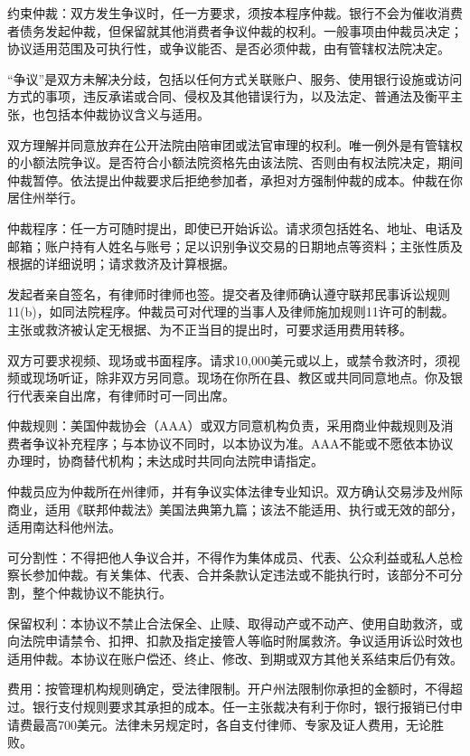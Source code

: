 \documentclass[UTF8,fontset=none,11pt,a4paper]{ctexart}
\begin{document}
约束仲裁：双方发生争议时，任一方要求，须按本程序仲裁。银行不会为催收消费者债务发起仲裁，但保留就其他消费者争议仲裁的权利。一般事项由仲裁员决定；协议适用范围及可执行性，或争议能否、是否必须仲裁，由有管辖权法院决定。


“争议”是双方未解决分歧，包括以任何方式关联账户、服务、使用银行设施或访问方式的事项，违反承诺或合同、侵权及其他错误行为，以及法定、普通法及衡平主张，也包括本仲裁协议含义与适用。


双方理解并同意放弃在公开法院由陪审团或法官审理的权利。唯一例外是有管辖权的小额法院争议。是否符合小额法院资格先由该法院、否则由有权法院决定，期间仲裁暂停。依法提出仲裁要求后拒绝参加者，承担对方强制仲裁的成本。仲裁在你居住州举行。


仲裁程序：任一方可随时提出，即使已开始诉讼。请求须包括姓名、地址、电话及邮箱；账户持有人姓名与账号；足以识别争议交易的日期地点等资料；主张性质及根据的详细说明；请求救济及计算根据。


发起者亲自签名，有律师时律师也签。提交者及律师确认遵守联邦民事诉讼规则11(b)，如同法院程序。仲裁员可对代理的当事人及律师施加规则11许可的制裁。主张或救济被认定无根据、为不正当目的提出时，可要求适用费用转移。


双方可要求视频、现场或书面程序。请求10,000美元或以上，或禁令救济时，须视频或现场听证，除非双方另同意。现场在你所在县、教区或共同同意地点。你及银行代表亲自出席，有律师时可一同出席。


仲裁规则：美国仲裁协会（AAA）或双方同意机构负责，采用商业仲裁规则及消费者争议补充程序；与本协议不同时，以本协议为准。AAA不能或不愿依本协议办理时，协商替代机构；未达成时共同向法院申请指定。


仲裁员应为仲裁所在州律师，并有争议实体法律专业知识。双方确认交易涉及州际商业，适用《联邦仲裁法》美国法典第九篇；该法不能适用、执行或无效的部分，适用南达科他州法。


可分割性：不得把他人争议合并，不得作为集体成员、代表、公众利益或私人总检察长参加仲裁。有关集体、代表、合并条款认定违法或不能执行时，该部分不可分割，整个仲裁协议不能执行。


保留权利：本协议不禁止合法保全、止赎、取得动产或不动产、使用自助救济，或向法院申请禁令、扣押、扣款及指定接管人等临时附属救济。争议适用诉讼时效也适用仲裁。本协议在账户偿还、终止、修改、到期或双方其他关系结束后仍有效。


费用：按管理机构规则确定，受法律限制。开户州法限制你承担的金额时，不得超过。银行支付规则要求其承担的成本。任一主张裁决有利于你时，银行报销已付申请费最高700美元。法律未另规定时，各自支付律师、专家及证人费用，无论胜败。
\end{document}
